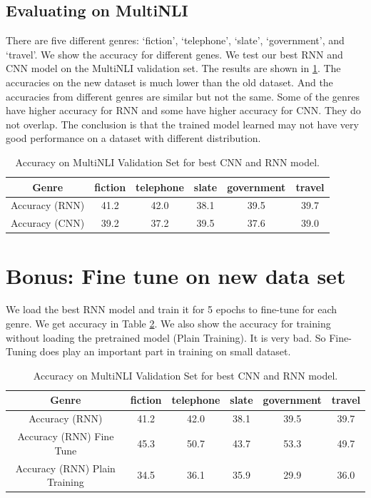 \documentclass[10pt,a4paper]{article}
\begin{document}
\subsection{Evaluating on MultiNLI}
There are five different genres: `fiction', `telephone', `slate', `government', and `travel'. We show the accuracy for different genes. We test our best RNN and CNN model on the MultiNLI validation set. The results are shown in \ref{tab: val}. The accuracies on the new dataset is much lower than the old dataset. And the accuracies from different genres are similar but not the same. Some of the genres have higher accuracy for RNN and some have higher accuracy for CNN. They do not overlap. The conclusion is that the trained model learned may not have very good performance on a dataset with different distribution. 
\begin{table}[!ht]
\centering
\begin{tabular}{|c|c|c|c|c|c|}
\hline
Genre & fiction & telephone & slate & government & travel\\ \hline
Accuracy (RNN) & 41.2 & 42.0 & 38.1 & 39.5 & 39.7 \\ \hline
Accuracy (CNN) & 39.2 & 37.2 & 39.5 & 37.6 & 39.0 \\ \hline
\end{tabular}
\caption{\label{tab: val}Accuracy on MultiNLI Validation Set for best CNN and RNN model.}
\end{table}
\clearpage
\section{Bonus: Fine tune on new data set}
We load the best RNN model and train it for 5 epochs to fine-tune for each genre. We get accuracy in Table \ref{tab: ft}. We also show the accuracy for training without loading the pretrained model (Plain Training). It is very bad. So Fine-Tuning does play an important part in training on small dataset.
\begin{table}[!ht]
\centering
\begin{tabular}{|c|c|c|c|c|c|}
\hline
Genre & fiction & telephone & slate & government & travel\\ \hline
Accuracy (RNN) & 41.2 & 42.0 & 38.1 & 39.5 & 39.7 \\ \hline
Accuracy (RNN) Fine Tune & 45.3 & 50.7 & 43.7 & 53.3 & 49.7 \\ \hline
Accuracy (RNN) Plain Training & 34.5 & 36.1 & 35.9 & 29.9& 36.0 \\ \hline
\end{tabular}
\caption{\label{tab: ft}Accuracy on MultiNLI Validation Set for best CNN and RNN model.}
\end{table}
\end{document}
